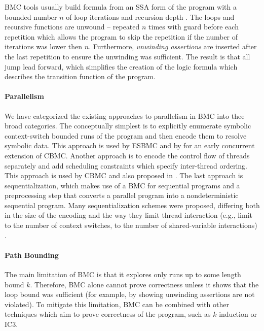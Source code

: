 BMC tools usually build formula from an SSA form of the program with a bounded number $n$ of loop iterations and recursion depth .
The loops and recursive functions are unwound -- repeated $n$ times with guard before each repetition which allows the program to skip the repetition if the number of iterations was lower then $n$.
Furthermore, \emph{unwinding assertions} are inserted after the last repetition to ensure the unwinding was sufficient.
The result is that all jump lead forward, which simplifies the creation of the logic formula which describes the transition function of the program.

\paragraph{Parallelism}


We have categorized the existing approaches to parallelism in BMC into thee broad categories.
The conceptually simplest is to explicitly enumerate symbolic context-switch
bounded runs of the program and then encode them to resolve symbolic data.
This approach is used by ESBMC  and by
 for an early concurrent extension of CBMC.
Another approach is to encode the control flow of threads separately and add scheduling constraints which specify inter-thread ordering.
This approach is used by CBMC  and also proposed in .
The last approach is sequentialization, which makes use of a BMC for sequential programs and a preprocessing step that converts a parallel program into a nondeterministic sequential program.
Many sequentialization schemes were proposed, differing both in the size of the encoding and the way they limit thread interaction (e.g., limit to the number of context switches, to the number of shared-variable interactions) .

\paragraph{Path Bounding}

The main limitation of BMC is that it explores only runs up to some length
bound $k$.
Therefore, BMC alone cannot prove correctness unless it shows that the loop
bound was sufficient (for example, by showing unwinding assertions are not
violated).
To mitigate this limitation, BMC can be combined with other techniques which
aim to prove correctness of the program, such as $k$-induction or
IC3.

